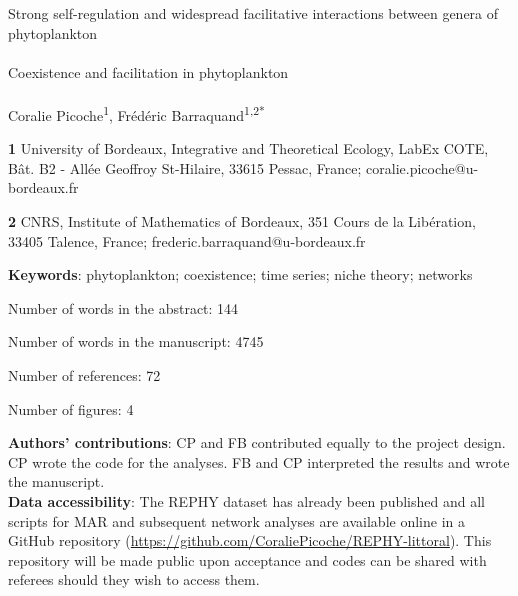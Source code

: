 \documentclass[10pt]{article}
\begin{document}
\thispagestyle{empty}
\vspace*{0.2in}


{\Large{}{Strong self-regulation and widespread facilitative interactions
between genera of phytoplankton} %
} \\
\bigskip{}
\textbf{\large{}}\\
{\large{}{Coexistence and facilitation in phytoplankton} %
} %
\\
\\
 \bigskip{}
Coralie Picoche\textsuperscript{1}, Frédéric Barraquand\textsuperscript{1,2{*}}
\\
 \bigskip{}

\textbf{1} University of Bordeaux, Integrative and Theoretical Ecology,
LabEx COTE, Bât. B2 - Allée Geoffroy St-Hilaire, 33615 Pessac, France;
coralie.picoche@u-bordeaux.fr

\textbf{2} CNRS, Institute of Mathematics of Bordeaux, 351 Cours de
la Libération, 33405 Talence, France; frederic.barraquand@u-bordeaux.fr
\\

\bigskip{}

\textbf{Keywords}: phytoplankton; coexistence; time series; niche
theory; networks

\bigskip{}
Number of words in the abstract: 144

Number of words in the manuscript: 4745 %

Number of references: 72

Number of figures: 4 \bigskip{}

\textbf{Authors' contributions}: CP and FB contributed equally to
the project design. CP wrote the code for the analyses. FB and CP
interpreted the results and wrote the manuscript.\\

\textbf{Data accessibility}: The REPHY dataset has already been published
\citep{REPHY_db} and all scripts for MAR and subsequent network analyses
are available online in a GitHub repository (\url{https://github.com/CoraliePicoche/REPHY-littoral}).
This repository will be made public upon acceptance and codes can
be shared with referees should they wish to access them.
\end{document}
